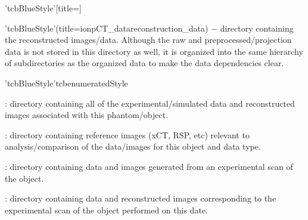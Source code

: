 \clearpage%
\begin{tcbfunctionenv}'tcbBlueStyle'[title=]
\begin{tcbparagraph}'tcbBlueStyle'(title=\dirsep ion\dirsep pCT\_data\dirsep reconstruction\_data)%
$\boldsymbol{-}$ directory containing the reconstructed images/data.  Although the raw and preprocessed/projection data is not stored in this directory as well, it is organized into the same hierarchy of subdirectories as the organized data to make the data dependencies clear.
\end{tcbparagraph}
\begin{tcbparagraph}'tcbBlueStyle'{tcbenumeratedStyle}
    \begin{deepList}[labelindent=1pt, leftmargin=*]
        \item {} : directory containing all of the experimental/simulated data and reconstructed images associated with this phantom/object.
        \begin{deepList}[labelindent=1pt, leftmargin=*]
            \item {} : directory containing reference images (xCT, RSP, etc) relevant to analysis/comparison of the data/images for this object and data type.
            \item {} : directory containing data and images generated from an experimental scan of the object.
            \begin{deepList}[labelindent=1pt, leftmargin=*]
                \item {} : directory containing data and reconstructed images corresponding to the experimental scan of the object performed on this date.

\end{deepList}
\end{deepList}
\end{deepList}
\end{tcbparagraph}
\end{tcbfunctionenv}
